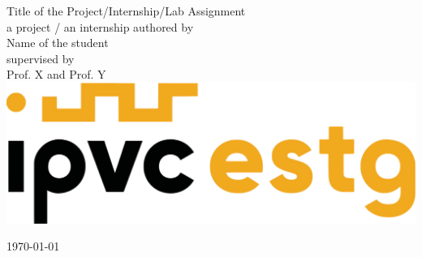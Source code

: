 \documentclass[11pt,a4paper]{report}
\begin{document}
\begin{titlepage}

\centering
\vspace{7cm}
\huge Title of the Project/Internship/Lab Assignment \\
\vspace{3cm}
\large a project / an internship authored by\\
\Large Name of the student\\
\vspace{2cm}
\large supervised by\\
\large Prof. X and Prof. Y\\

\vspace{3cm}
\includegraphics[scale=0.5]{figs/ESTG_logo.png}

\daymonthyear\today \\
\end{titlepage}
\end{document}
